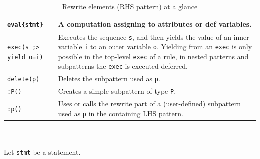 \begin{table}[htbp]
\begin{minipage}{\linewidth}
\begin{tabularx}{\linewidth}{|lX|}
\hline
\texttt{eval\{stmt\}} & A computation assigning to attributes or def variables.\\
\hline
\texttt{exec(s ;> yield o=i)} & Executes the sequence \texttt{s}, and then yields the value of an inner variable \texttt{i} to an outer variable \texttt{o}. Yielding from an \texttt{exec} is only possible in the top-level \texttt{exec} of a rule, in nested patterns and subpatterns the \texttt{exec} is executed deferred.\\
\hline
\texttt{delete(p)} & Deletes the subpattern used as \texttt{p}.\\
\texttt{:P()} & Creates a simple subpattern of type \texttt{P}.\\
\texttt{:p()} & Uses or calls the rewrite part of a (user-defined) subpattern used as \texttt{p} in the containing LHS pattern.\\
\hline
\end{tabularx}
\end{minipage}\\
\\ 
{\small Let \texttt{stmt} be a statement.}
\caption{Rewrite elements (RHS pattern) at a glance}
\label{rewritestab}
\end{table}

